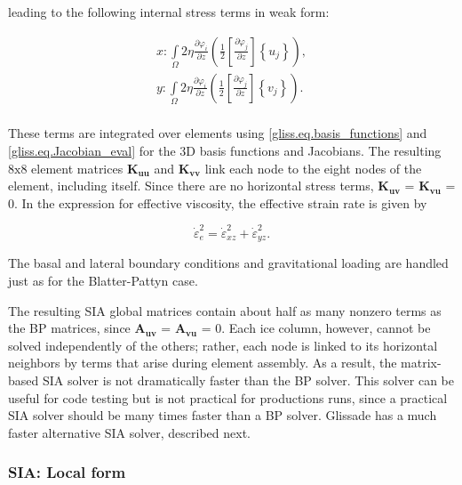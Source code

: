 {\noindent
leading to the following internal stress terms in weak form:

\begin{equation}
  \label{gliss.eq.element_matrix_sia}
  \begin{split}
    x: \int\limits_{\Omega } {2 \eta \frac{\partial {{\varphi }_{i}}}{\partial z}\left( \frac{1}{2}\left[ \frac{\partial {{\varphi }_{j}}}{\partial z} \right]\left\{ {{u}_{j}} \right\} \right) },  \\
    y: \int\limits_{\Omega } {2 \eta \frac{\partial {{\varphi }_{i}}}{\partial z}\left( \frac{1}{2}\left[ \frac{\partial {{\varphi }_{j}}}{\partial z} \right]\left\{ {{v}_{j}} \right\} \right) }.  \\
  \end{split}
\end{equation}

\noindent
These terms are integrated over elements using \eqref{gliss.eq.basis_functions}
and \eqref{gliss.eq.Jacobian_eval} for the 3D basis functions and Jacobians.
The resulting $8\text{x}8$ element matrices $\mathbf{K_{uu}}$ and $\mathbf{K_{vv}}$ link each node
to the eight nodes of the element, including itself.  Since there are no
horizontal stress terms, $\mathbf{K_{uv}}$ = $\mathbf{K_{vu}}$ = 0. In the expression for
effective viscosity, the effective strain rate is given by

\begin{equation}
  \label{gliss.eq.effective_strain_rate_sia}
        {\dot{\varepsilon }}^{2}_{e} = {\dot{\varepsilon }}^{2}_{xz} + {\dot{\varepsilon }}^{2}_{yz}.
\end{equation}

\noindent
The basal and lateral boundary conditions and gravitational loading are handled
just as for the Blatter-Pattyn case.

The resulting SIA global matrices contain about half as many nonzero terms as the BP matrices,
since $\mathbf{A_{uv}}$ = $\mathbf{A_{vu}}$ = 0.  Each ice column, however, cannot be solved independently of the others;
rather, each node is linked to its horizontal neighbors by terms that arise during
element assembly.  As a result, the matrix-based SIA solver is not dramatically faster than the BP solver.
This solver can be useful for code testing
but is not practical for productions runs, since a practical SIA solver should be many times
faster than a BP solver.  Glissade has a much faster alternative SIA solver,
described next.

\subsubsection{SIA: Local form}

}
